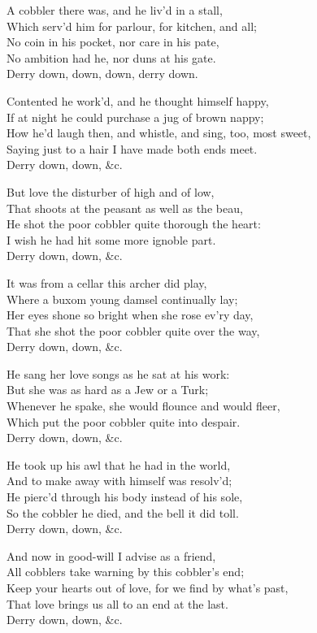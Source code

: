 \begin{dcverse}A cobbler there was, and he liv’d in a stall,\\
Which serv’d him for parlour, for kitchen, and all;\\
No coin in his pocket, nor care in his pate,\\
No ambition had he, nor duns at his gate.\\
\vin Derry down, down, down, derry down.

Contented he work’d, and he thought himself happy, \\
If at night he could purchase a jug of brown nappy;\\
How he’d laugh then, and whistle, and sing, too, most sweet,\\
Saying just to a hair I have made both ends meet. \\
\vin Derry down, down, \&c.

But love the disturber of high and of low,\\
That shoots at the peasant as well as the beau,\\
He shot the poor cobbler quite thorough the heart:\\
I wish he had hit some more ignoble part.\\
\vin Derry down, down, \&c.

It was from a cellar this archer did play,\\
Where a buxom young damsel continually lay;\\
Her eyes shone so bright when she rose ev’ry day, \\
That she shot the poor cobbler quite over the way,\\
\vin Derry down, down, \&c.
\end{dcverse}
\pagebreak

\begin{dcverse}He sang her love songs as he sat at his work:\\
But she was as hard as a Jew or a Turk;\\
Whenever he spake, she would flounce and would fleer,\\
Which put the poor cobbler quite into despair.\\
\vin Derry down, down, \&c.

He took up his awl that he had in the world,\\
And to make away with himself was resolv’d;\\
He pierc’d through his body instead of his sole,\\
So the cobbler he died, and the bell it did toll.\\
\vin Derry down, down, \&c.

And now in good-will I advise as a friend,\\
All cobblers take warning by this cobbler’s end; \\
Keep your hearts out of love, for we find by what’s past,\\
That love brings us all to an end at the last.\\
\vin Derry down, down, \&c.
\end{dcverse}

